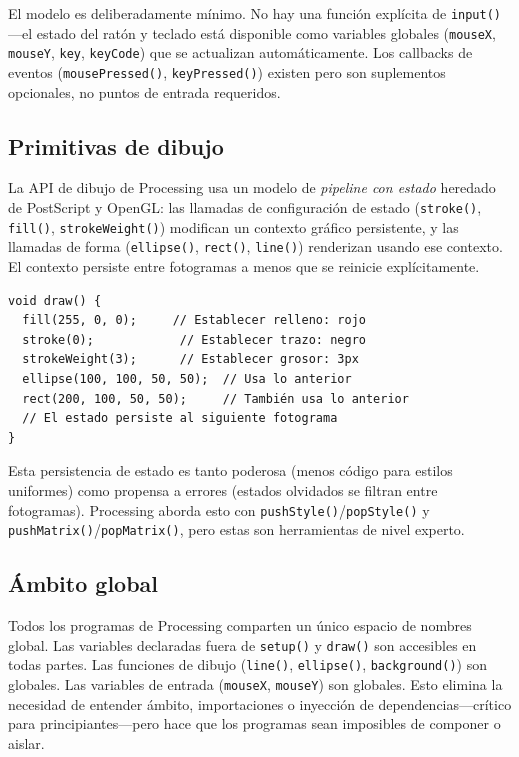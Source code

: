 \documentclass[10pt,letterpaper,twocolumn]{article}
\begin{document}
El modelo es deliberadamente mínimo. No hay una función explícita de \texttt{input()}---el estado del ratón y teclado está disponible como variables globales (\texttt{mouseX}, \texttt{mouseY}, \texttt{key}, \texttt{keyCode}) que se actualizan automáticamente. Los callbacks de eventos (\texttt{mousePressed()}, \texttt{keyPressed()}) existen pero son suplementos opcionales, no puntos de entrada requeridos.

\subsection{Primitivas de dibujo}

La API de dibujo de Processing usa un modelo de \emph{pipeline con estado} heredado de PostScript y OpenGL: las llamadas de configuración de estado (\texttt{stroke()}, \texttt{fill()}, \texttt{strokeWeight()}) modifican un contexto gráfico persistente, y las llamadas de forma (\texttt{ellipse()}, \texttt{rect()}, \texttt{line()}) renderizan usando ese contexto. El contexto persiste entre fotogramas a menos que se reinicie explícitamente.

\begin{lstlisting}[style=processingstyle,caption={Contexto de dibujo con estado.}]
void draw() {
  fill(255, 0, 0);     // Establecer relleno: rojo
  stroke(0);            // Establecer trazo: negro
  strokeWeight(3);      // Establecer grosor: 3px
  ellipse(100, 100, 50, 50);  // Usa lo anterior
  rect(200, 100, 50, 50);     // También usa lo anterior
  // El estado persiste al siguiente fotograma
}
\end{lstlisting}

Esta persistencia de estado es tanto poderosa (menos código para estilos uniformes) como propensa a errores (estados olvidados se filtran entre fotogramas). Processing aborda esto con \texttt{pushStyle()}/\texttt{popStyle()} y \texttt{pushMatrix()}/\texttt{popMatrix()}, pero estas son herramientas de nivel experto.

\subsection{Ámbito global}

Todos los programas de Processing comparten un único espacio de nombres global. Las variables declaradas fuera de \texttt{setup()} y \texttt{draw()} son accesibles en todas partes. Las funciones de dibujo (\texttt{line()}, \texttt{ellipse()}, \texttt{background()}) son globales. Las variables de entrada (\texttt{mouseX}, \texttt{mouseY}) son globales. Esto elimina la necesidad de entender ámbito, importaciones o inyección de dependencias---crítico para principiantes---pero hace que los programas sean imposibles de componer o aislar.
\end{document}
